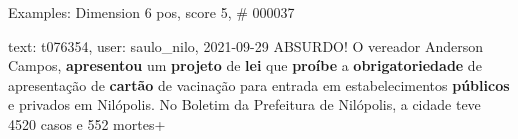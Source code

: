 \begin{frame}{Examples: Dimension 6 pos, score 5, \# 000037}
\footnotesize
\begin{exampleblock}{text: t076354, user: saulo\_nilo, 2021-09-29}
ABSURDO! O vereador Anderson Campos, \textbf{apresentou} um \textbf{projeto} de 
\textbf{lei} que \textbf{proíbe} a \textbf{obrigatoriedade} de apresentação de 
\textbf{cartão} de vacinação para entrada em estabelecimentos \textbf{públicos} 
e privados em Nilópolis. No Boletim da Prefeitura de Nilópolis, a cidade teve 
4520 casos e 552 mortes+ 
\end{exampleblock}
\end{frame}
